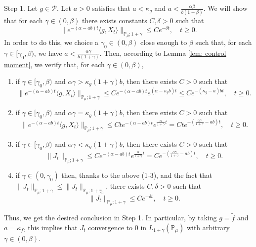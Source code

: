 \documentclass[12pt]{amsart}
\theoremstyle{plain}
\theoremstyle{definition}
\numberwithin{equation}{section}
\begin{document}
	Step 1. Let $g\in \mathcal P$. 
	Let $a > 0$ satisfies that $a< \kappa_g$ and $a < \frac{\alpha \beta}{b(1+\beta)}$. 
	We will show that for each $\gamma\in (0,\beta)$ there exists constants $C,\delta > 0$ such that
\[
	\|e^{-(\alpha - ab)t} \langle g, X_t\rangle\|_{\mathbb P_\mu;1+\gamma} 
	\leq C e^{-\delta t},
	\quad t\geq 0.
\] 
	In order to do this, we choice a $\gamma_0 \in (0,\beta)$ close enough to $\beta$ such that, for each $\gamma \in [\gamma_0, \beta)$, we have $a < \frac{\alpha\gamma}{b(1+\gamma)}$.
	Then, according to Lemma \ref{lem: control moment}, we verify that, for each $\gamma \in (0,\beta)$,
\begin{enumerate}
\item 
	if $\gamma \in [\gamma_0, \beta)$ and $\alpha\gamma> \kappa_g (1+\gamma)b$, then there exists $C>0$ such that
\[
    \|e^{-(\alpha - ab)t} \langle g, X_t\rangle\|_{\mathbb P_\mu;1+\gamma}
    \leq C e^{-(\alpha-ab)t}e^{(\alpha-\kappa_g b)t}
    \leq C  e^{-(\kappa_g - a)bt},
    \quad t\geq 0.
\]
\item 
	if $\gamma \in [\gamma_0, \beta)$ and $\alpha\gamma=\kappa_g(1+\gamma)b$, then there exists $C>0$ such that
\[
     \|e^{-(\alpha - ab)t} \langle g, X_t\rangle\|_{\mathbb P_\mu;1+\gamma}
     \leq C t e^{-(\alpha - a b)t}e^{\frac{\alpha}{1+\gamma}t}
     = C t e^{-(\frac{\alpha \gamma}{1+\gamma} - ab)t},
     \quad t\geq 0.
\]
\item 
	if $\gamma \in [\gamma_0, \beta)$ and $\alpha\gamma < \kappa_g (1+\gamma)b$, then there exists $C>0$ such that
\[
    \|J_t\|_{\mathbb{P}_{\mu};1+\gamma}
    \leq C  e^{-(\alpha - a b)t}e^{\frac{\alpha}{1+\gamma}t}
     = C  e^{-(\frac{\alpha \gamma}{1+\gamma} - ab)t},
     \quad t\geq 0.
\]
\item
	if $\gamma \in (0,\gamma_0)$ then, thanks to the above (1-3), and the fact that $\|J_t\|_{\mathbb{P}_{\mu};1+\gamma} 
	\leq \|J_t\|_{\mathbb{P}_{\mu};1+\gamma_0}$, there exists $C, \delta >0$ such that
\[
	\|J_t\|_{\mathbb{P}_{\mu};1+\gamma} 
	\leq Ce^{-\delta t},
	\quad t\geq 0.
\]
\end{enumerate}
	Thus, we get the desired conclusion in Step 1. 
	In particular, by taking $g = \tilde f$ and $a = \kappa_f$, this implies that $J_t$ convergence to $0$ in $L_{1+\gamma}(\mathbb{P}_{\mu})$ with arbitrary $\gamma\in(0,\beta)$.
\end{document}
